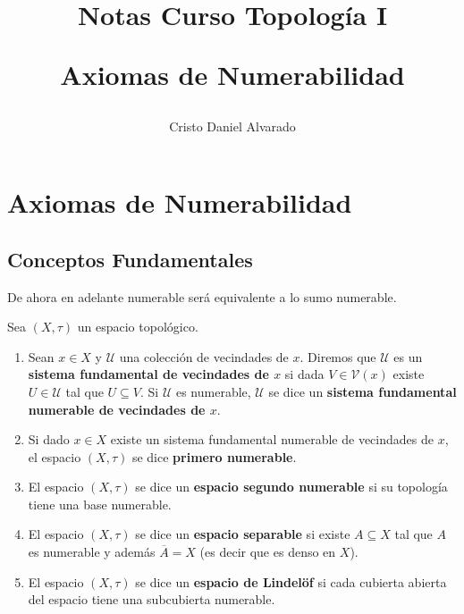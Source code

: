 \documentclass[12pt]{report}
\theoremstyle{largebreak}
\newcommand{\Cls}[1]{\ensuremath{\overline{#1}}}
\begin{document}
    \setlength{\parskip}{5pt} %
    \setlength{\parindent}{12pt} %
    \title{Notas Curso Topología I
    
    Axiomas de Numerabilidad}
    \author{Cristo Daniel Alvarado}
    \maketitle

    \tableofcontents %

    \setcounter{chapter}{4} %
    
    \chapter{Axiomas de Numerabilidad}
    
    \section{Conceptos Fundamentales}

    \begin{obs}
        De ahora en adelante numerable será equivalente a lo sumo numerable.
    \end{obs}

    \begin{mydef}
        Sea $(X,\tau)$ un espacio topológico.
        \begin{enumerate}
            \item  Sean $x\in X$ y $\mathcal{U}$ una colección de vecindades de $x$. Diremos que $\mathcal{U}$ es un \textbf{sistema fundamental de vecindades de $x$} si dada $V\in\mathcal{V}(x)$ existe $U\in\mathcal{U}$ tal que $U\subseteq V$. Si $\mathcal{U}$ es numerable, $\mathcal{U}$ se dice un \textbf{sistema fundamental numerable de vecindades de $x$}.
            \item Si dado $x\in X$ existe un sistema fundamental numerable de vecindades de $x$, el espacio $(X,\tau)$ se dice \textbf{primero numerable}.
            \item El espacio $(X,\tau)$ se dice un \textbf{espacio segundo numerable} si su topología tiene una base numerable.
            \item El espacio $(X,\tau)$ se dice un \textbf{espacio separable} si existe $A\subseteq X$ tal que $A$ es numerable y además $\Cls{A}=X$ (es decir que es denso en $X$).
            \item El espacio $(X,\tau)$ se dice un \textbf{espacio de Lindelöf} si cada cubierta abierta del espacio tiene una subcubierta numerable.
        \end{enumerate}
    \end{mydef}
\end{document}
